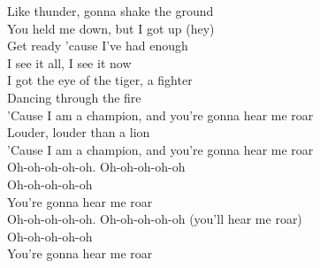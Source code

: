 Like thunder, gonna shake the ground\\
You held me down, but I got up (hey)\\
Get ready 'cause I've had enough\\
I see it all, I see it now\\
I got the eye of the tiger, a fighter\\
Dancing through the fire\\
'Cause I am a champion, and you're gonna hear me roar\\
Louder, louder than a lion\\
'Cause I am a champion, and you're gonna hear me roar\\
Oh-oh-oh-oh-oh. Oh-oh-oh-oh-oh\\
Oh-oh-oh-oh-oh\\
You're gonna hear me roar\\
Oh-oh-oh-oh-oh. Oh-oh-oh-oh-oh (you'll hear me roar)\\
Oh-oh-oh-oh-oh\\
You're gonna hear me roar

